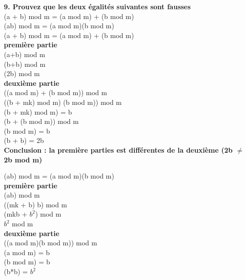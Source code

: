 \newpage
\textbf{9. Prouvez que les deux égalités suivantes sont fausses}\\

      (a + b) mod m = (a mod m) + (b mod m) \\
      (ab) mod m = (a mod m)(b mod m) \\

(a + b) mod m = (a mod m) + (b mod m) \\

\textbf{première partie} \\

(a+b) mod m \\
(b+b) mod m \\
(2b) mod m \\

\textbf{deuxième partie} \\

((a mod m) + (b mod m)) mod m  \\
((b + mk) mod m) (b mod m)) mod m \\

(b + mk) mod m) = b \\
(b + (b mod m)) mod m \\

(b mod m) = b \\
(b + b) = 2b \\

\textbf{Conclusion : la première parties est différentes de la deuxième (2b $\ne$ 2b mod m) } \\

\vspace{4mm}

(ab) mod m = (a mod m)(b mod m) \\

\textbf{première partie} \\

(ab) mod m \\
((mk + b) b) mod m \\
(mkb + $b^{2}$) mod m \\
$b^{2}$ mod m \\

\textbf{deuxième partie} \\

((a mod m)(b mod m)) mod m \\

(a mod m) = b \\
(b mod m) = b \\

(b*b) = $b^{2}$ \\

